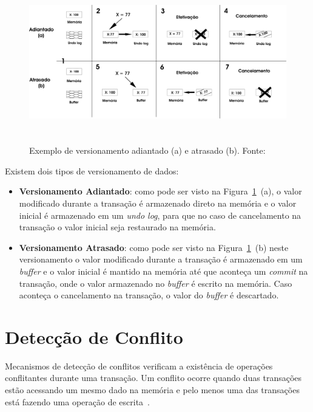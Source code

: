 \documentclass[diss,capa]{texufpel}
\begin{document}
\begin{figure}[!htp]
\centering
\includegraphics[height=7cm]{images/versionamento.png}
\caption{Exemplo de versionamento adiantado (a) e atrasado (b). Fonte:~\cite{BaldassinTese2009}}
\label{figuraversionamento}
\end{figure}

Existem dois tipos de versionamento de dados:

\begin{itemize}
\item \textbf{Versionamento Adiantado}: como pode ser visto na Figura~\ref{figuraversionamento}~(a), o valor modificado durante a transação é armazenado direto na memória e o valor inicial é armazenado em um \emph{undo log}, para que no caso de cancelamento na transação o valor inicial seja restaurado na memória.

\item \textbf{Versionamento Atrasado}: como pode ser visto na Figura~\ref{figuraversionamento}~(b) neste versionamento o valor modificado durante a transação é armazenado em um \emph{buffer} e o valor inicial é mantido na memória até que aconteça um \emph{commit} na transação, onde o valor armazenado no \emph{buffer} é escrito na memória. Caso aconteça o cancelamento na transação, o valor do \emph{buffer} é descartado.
\end{itemize}

\section{Detecção de Conflito}

Mecanismos de detecção de conflitos verificam a existência de operações conflitantes durante uma transação. Um conflito ocorre quando duas transações estão acessando um mesmo dado na memória e pelo menos uma das transações está fazendo uma operação de escrita~\cite{BaldassinTese2009}.
\end{document}
